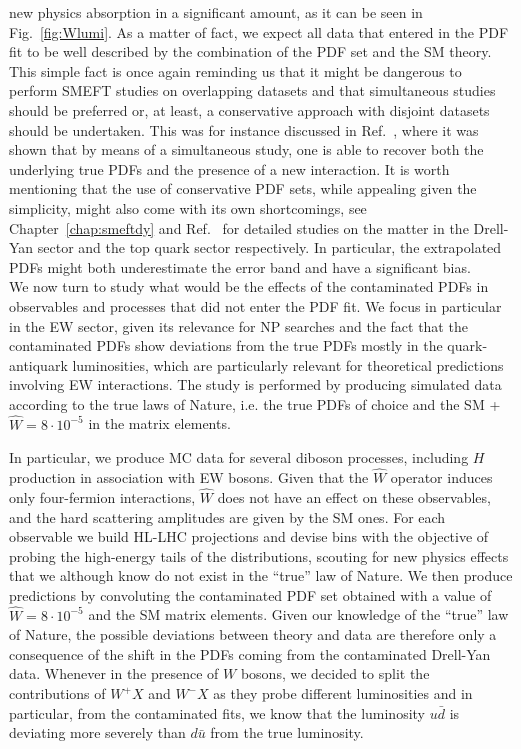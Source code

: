 \documentclass[withindex,glossary]{cam-thesis}
\begin{document}
new physics absorption in a significant amount, as it can be seen in Fig.~\ref{fig:Wlumi}. 
As a matter of fact, we expect all data that entered in the PDF fit to be well described by the combination of the PDF set and the SM theory.
This simple fact is once again reminding us that it might be dangerous to perform SMEFT studies on overlapping datasets and that simultaneous studies should be preferred or, at least, a conservative approach with disjoint datasets should be undertaken. 
This was for instance discussed in Ref.~\cite{Iranipour:2022iak}, 
where it was shown that by means of a simultaneous study, one is able to recover 
both the underlying true PDFs and the presence of a new interaction. It is worth 
mentioning that the use of conservative PDF sets, while appealing given the simplicity, 
might also come with its own shortcomings, see Chapter~\ref{chap:smeftdy} and Ref.~\cite{Kassabov:2023hbm} for detailed studies on the matter in the 
Drell-Yan sector and the top quark sector respectively. In particular, 
the extrapolated PDFs might both underestimate the error band and
have a significant bias.\\

\noindent We now turn to study what would be the effects of the contaminated PDFs in observables and processes that did not enter the PDF fit.
We focus in particular in the EW sector, given its relevance for NP searches and the fact that the contaminated PDFs show deviations from 
the true PDFs mostly in the quark-antiquark luminosities, which are particularly relevant for theoretical predictions involving EW interactions.
%
The study is performed by producing simulated data according to the true laws of Nature, i.e. the true PDFs of choice and 
the SM + $\hat{W}=8\cdot 10^{-5}$ in the matrix elements. 

In particular, we 
produce MC data for several diboson processes, including $H$ production in association with EW bosons. 
Given that the $\hat{W}$ operator 
induces only four-fermion interactions, $\hat{W}$ does not have an effect on these observables, and the hard scattering 
amplitudes are given by the SM ones. For each observable we build HL-LHC projections and devise bins with the objective 
of probing the high-energy tails of the distributions, scouting for new physics effects that we although know do not exist in the ``true'' law of Nature.  
%
We then produce predictions by convoluting the contaminated PDF set obtained with a value of $\hat{W}=8\cdot 10^{-5}$ and the SM matrix elements. 
Given our knowledge of the ``true'' law of Nature, the possible deviations between theory and data are therefore
only a consequence of the shift in the PDFs coming from the contaminated Drell-Yan data.
Whenever in the presence of $W$ bosons, we decided to split the contributions of $W^+ X$ and $W^- X$ as they probe different luminosities and in particular, 
from the contaminated fits, we know that the luminosity $u \bar{d}$ is deviating more severely than $d \bar{u}$ from the true luminosity.
\end{document}
